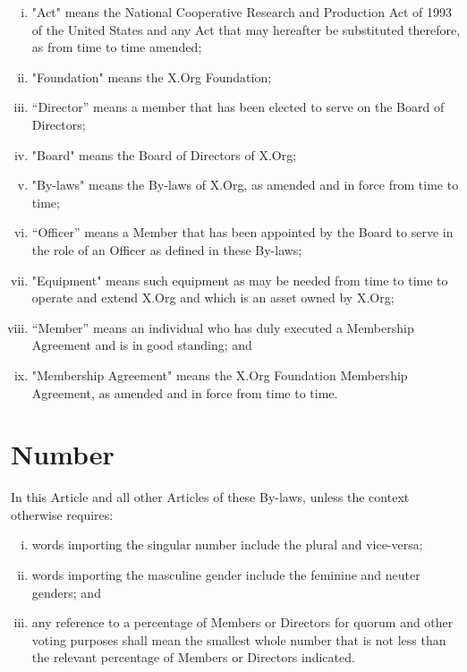 \documentclass[10pt, english]{bylaws}
\begin{document}
\begin{enumerate}[(i)\hspace{.2cm}]
	\item "Act" means the National Cooperative Research and Production Act
	of 1993 of the United States and any Act that may hereafter be
	substituted therefore, as from time to time amended;

	\item "Foundation" means the X.Org Foundation;

	\item “Director” means a member that has been elected to serve on the
	Board of Directors;

	\item "Board" means the Board of Directors of X.Org;

	\item "By-laws" means the By-laws of X.Org, as amended and in force
	from time to time;

	\item “Officer” means a Member that has been appointed by the Board to
	serve in the role of an Officer as defined in these By-laws;

	\item "Equipment" means such equipment as may be needed from time to
	time to operate and extend X.Org and which is an asset owned by X.Org;

	\item “Member” means an individual who has duly executed a Membership
	Agreement and is in good standing; and

	\item "Membership Agreement" means the X.Org Foundation Membership
	Agreement, as amended and in force from time to time.
\end{enumerate}

\section{Number}
In this Article and all other Articles of these By-laws, unless the context
otherwise requires:

\begin{enumerate}[(i)\hspace{.2cm}]
	\item words importing the singular number include the plural and
		vice-versa;

	\item words importing the masculine gender include the feminine and
	neuter genders; and

	\item any reference to a percentage of Members or Directors for quorum
	and other voting purposes shall mean the smallest whole number
	that is not less than the relevant percentage of Members or Directors
	indicated.
\end{enumerate}
\end{document}
